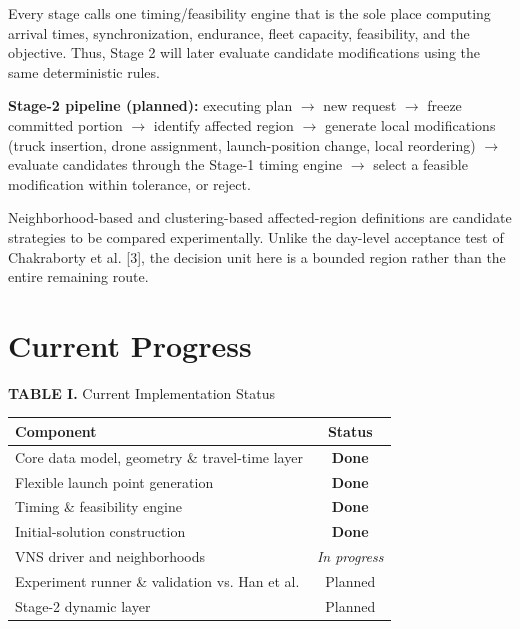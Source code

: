 \documentclass[10pt,a4paper]{article}
\begin{document}
Every stage calls one timing/feasibility engine that is the sole place
computing arrival times, synchronization, endurance, fleet capacity,
feasibility, and the objective. Thus, Stage 2 will later evaluate
candidate modifications using the same deterministic rules.

\textbf{Stage-2 pipeline (planned):}
executing plan $\rightarrow$ new request $\rightarrow$ freeze committed
portion $\rightarrow$ identify affected region $\rightarrow$ generate
local modifications (truck insertion, drone assignment, launch-position
change, local reordering) $\rightarrow$ evaluate candidates through
the Stage-1 timing engine $\rightarrow$ select a feasible modification
within tolerance, or reject.

Neighborhood-based and clustering-based affected-region definitions
are candidate strategies to be compared experimentally. Unlike the
day-level acceptance test of Chakraborty et al. [3], the decision unit
here is a bounded region rather than the entire remaining route.

\section{Current Progress}

\begin{center}
\footnotesize
\textbf{TABLE I.} Current Implementation Status

\vspace{2pt}

\begin{tabular}{p{}c}
\toprule
\textbf{Component} & \textbf{Status}\\
\midrule
Core data model, geometry \& travel-time layer & \textbf{Done}\\
Flexible launch point generation & \textbf{Done}\\
Timing \& feasibility engine & \textbf{Done}\\
Initial-solution construction & \textbf{Done}\\
VNS driver and neighborhoods & \textit{In progress}\\
Experiment runner \& validation vs. Han et al. & Planned\\
Stage-2 dynamic layer & Planned\\
\bottomrule
\end{tabular}
\end{center}
\end{document}
